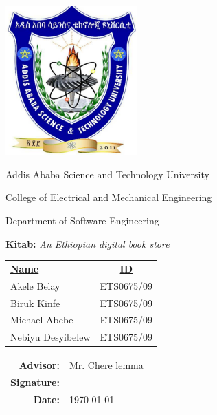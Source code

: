 \begin{titlepage}
	\begin{center}
		\includegraphics[width=2in]{AASTU_logo.png}

		\vspace{1cm}

		\LARGE{Addis Ababa Science and Technology University}

		\LARGE{College of Electrical and Mechanical Engineering}

		\LARGE{Department of Software Engineering}

		\vspace{1cm}
		\Large{\textbf{Kitab:} \textit{An Ethiopian digital book store}}
	
	\end{center}

	\vfill

	\begin{center}
		\begin{tabular}{l c}
			\underline{\textbf{Name}} & \underline{\textbf{ID}} \\
			Akele Belay & ETS0675/09 \\
			Biruk Kinfe & ETS0675/09 \\
			Michael Abebe & ETS0675/09 \\
			Nebiyu Desyibelew & ETS0675/09 \\
		\end{tabular}
	\end{center}

	\vfill

	\begin{flushright}
		\begin{tabular}{r l}
			\textbf{Advisor:} & Mr. Chere lemma \\
			\vspace{0.5cm}
			\textbf{Signature:} & \\
			\vspace{0.5cm}
			\textbf{Date:} & \today \\
		\end{tabular}
	\end{flushright}

\end{titlepage}